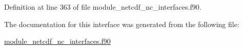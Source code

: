 Definition at line 363 of file module\+\_\+netcdf\+\_\+nc\+\_\+interfaces.\+f90.



The documentation for this interface was generated from the following file\+:\begin{DoxyCompactItemize}
\item 
\hyperlink{module__netcdf__nc__interfaces_8f90}{module\+\_\+netcdf\+\_\+nc\+\_\+interfaces.\+f90}\end{DoxyCompactItemize}
